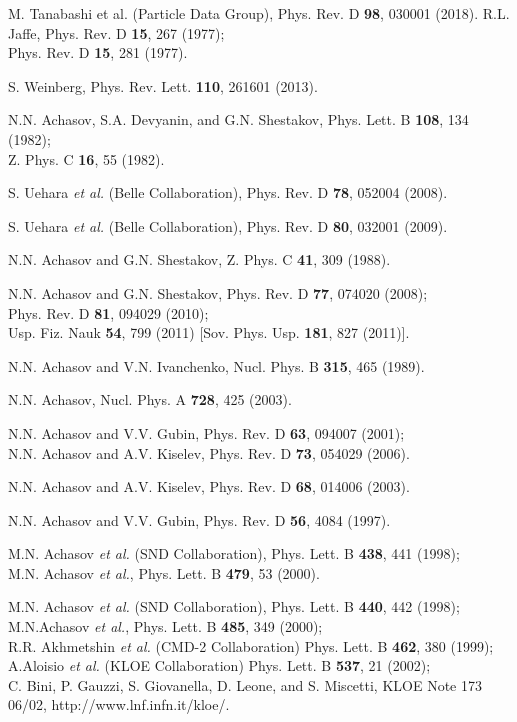 \documentclass[aps,preprint,groupedaddress,floatfix]{revtex4}
\begin{document}
\begin{thebibliography}{99}
M. Tanabashi et al. (Particle Data Group), Phys. Rev. D {\bf 98},
030001 (2018).
R.L. Jaffe, Phys. Rev. D {\bf 15}, 267 (1977);\\ Phys. Rev. D {\bf
15}, 281 (1977).

S. Weinberg, Phys. Rev. Lett. {\bf 110}, 261601 (2013).

N.N. Achasov, S.A. Devyanin, and G.N. Shestakov, Phys. Lett. B
{\bf 108}, 134 (1982);\\ Z. Phys. C {\bf 16}, 55 (1982).

S. Uehara {\it et al.} (Belle Collaboration), Phys. Rev. D {\bf
78}, 052004 (2008).

S. Uehara {\it et al.} (Belle Collaboration), Phys. Rev. D {\bf
80}, 032001 (2009).

N.N. Achasov and G.N. Shestakov, Z. Phys. C {\bf 41}, 309 (1988).

N.N. Achasov and G.N. Shestakov, Phys. Rev. D {\bf 77}, 074020
(2008);\\ Phys. Rev. D {\bf 81}, 094029 (2010);\\ Usp. Fiz. Nauk
{\bf 54}, 799 (2011) [Sov. Phys. Usp. {\bf 181}, 827 (2011)].

N.N. Achasov and V.N. Ivanchenko, Nucl. Phys. B {\bf 315}, 465
(1989).

N.N. Achasov, Nucl. Phys. A {\bf 728}, 425 (2003).

N.N. Achasov and V.V. Gubin, Phys. Rev. D {\bf 63}, 094007
(2001);\\ N.N. Achasov and A.V. Kiselev, Phys. Rev. D {\bf 73},
054029 (2006).

N.N. Achasov and A.V. Kiselev, Phys. Rev. D {\bf 68}, 014006
(2003).

N.N. Achasov and V.V. Gubin, Phys. Rev. D {\bf 56}, 4084 (1997).

M.N. Achasov {\it et al.} (SND Collaboration), Phys. Lett. B {\bf
438}, 441 (1998);\\ M.N. Achasov {\it et al.}, Phys. Lett. B {\bf
479}, 53 (2000).

M.N. Achasov {\it et al.} (SND Collaboration), Phys. Lett. B {\bf
440}, 442 (1998);\\ M.N.Achasov {\it et al.}, Phys. Lett. B {\bf
485}, 349 (2000);\\ R.R. Akhmetshin {\it et al.} (CMD-2
Collaboration) Phys. Lett. B {\bf 462}, 380 (1999);\\ A.Aloisio
{\it et al.} (KLOE Collaboration) Phys. Lett. B {\bf 537}, 21
(2002);\\ C. Bini, P. Gauzzi, S. Giovanella, D. Leone, and S.
Miscetti, KLOE Note 173 06/02, http://www.lnf.infn.it/kloe/.


\end{thebibliography}
\end{document}
